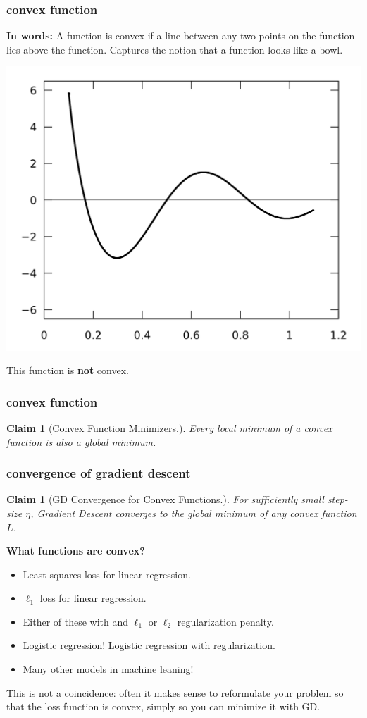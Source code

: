 \documentclass[handout,compress]{beamer}
\newtheorem{claim}[theorem]{Claim}
\begin{document}
\begin{frame}
		\frametitle{convex function}
	\textbf{In words:} A function is convex if a line between any two points on the function lies above the function. Captures the notion that a function looks like a bowl.
	
	\begin{center}
				\includegraphics[width=.7\textwidth]{local_min_blank.png}
				
		This function is \textbf{not} convex.
	\end{center} 
	
\end{frame}

\begin{frame}[t]
	\frametitle{convex function}
		\begin{claim}[Convex Function Minimizers.]
		Every \emph{local} minimum of a convex function is also a \emph{global minimum}.
	\end{claim}
	
\end{frame}

\begin{frame}[t]
	\frametitle{convergence of gradient descent}
	\begin{claim}[GD Convergence for Convex Functions.]
		For sufficiently small step-size $\eta$, Gradient Descent converges to the global minimum of any convex function $L$.
	\end{claim}

	\textbf{What functions are convex?}
	\begin{itemize}
		\item Least squares loss for linear regression.
		\item $\ell_1$ loss for linear regression.
		\item Either of these with and $\ell_1$ or $\ell_2$ regularization penalty. 
		\item Logistic regression! Logistic regression with regularization.
		\item Many other models in machine leaning!
	\end{itemize}
\begin{center}
	This is not a coincidence: often it makes sense to reformulate your problem so that the loss function is convex, simply so you can minimize it with GD. 
\end{center}
\end{frame}
\end{document}

